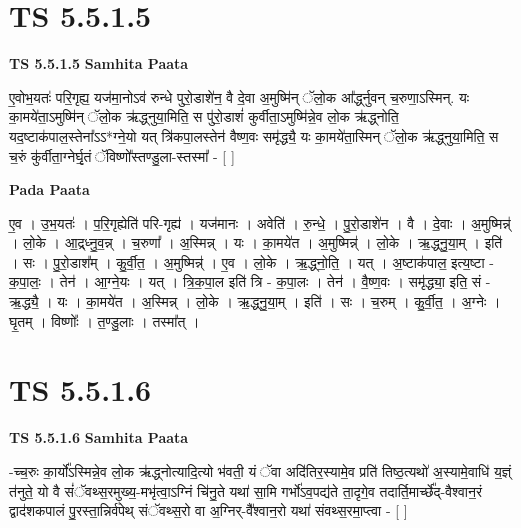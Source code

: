 \documentclass[17pt]{extarticle}
\begin{document}

\section{ TS 5.5.1.5 }

\textbf{TS 5.5.1.5 } \newline
\textbf{Samhita Paata} \newline

ए॒वोभ॒यतः॑ परि॒गृह्य॒ यज॑मा॒नोऽव॑ रुन्धे पुरो॒डाशे॑न॒ वै दे॒वा अ॒मुष्मि॑न् ॅलो॒क आ᳚र्द्ध्नुवन् च॒रुणा॒ऽस्मिन्. यः का॒मये॑ता॒ऽमुष्मि॑न् ॅलो॒क ऋ॑द्ध्नुया॒मिति॒ स पु॑रो॒डाशं॑ कुर्वीता॒ऽमुष्मि॑न्ने॒व लो॒क ऋ॑द्ध्नोति॒ यद॒ष्टाक॑पाल॒स्तेना᳚ऽऽ*ग्ने॒यो यत् त्रि॑कपा॒लस्तेन॑ वैष्ण॒वः समृ॑द्ध्यै॒ यः का॒मये॑ता॒स्मिन् ॅलो॒क ऋ॑द्ध्नुया॒मिति॒ स च॒रुं कु॑र्वीता॒ग्नेर्घृ॒तं ॅविष्णो᳚स्तण्डु॒ला-स्तस्मा᳚ - [  ] \newline

\textbf{Pada Paata} \newline

ए॒व । उ॒भ॒यतः॑ । प॒रि॒गृह्येति॑ परि-गृह्य॑ । यज॑मानः । अवेति॑ । रु॒न्धे॒ । पु॒रो॒डाशे॑न । वै । दे॒वाः । अ॒मुष्मिन्न्॑ । लो॒के । आ॒द्र्ध्नु॒व॒न्न् । च॒रुणा᳚ । अ॒स्मिन्न् । यः । का॒मये॑त । अ॒मुष्मिन्न्॑ । लो॒के । ऋ॒द्ध्नु॒या॒म् । इति॑ । सः । पु॒रो॒डाश᳚म् । कु॒र्वी॒त॒ । अ॒मुष्मिन्न्॑ । ए॒व । लो॒के । ऋ॒द्ध्नो॒ति॒ । यत् । अ॒ष्टाक॑पाल॒ इत्य॒ष्टा - क॒पा॒लः॒ । तेन॑ । आ॒ग्ने॒यः । यत् । त्रि॒क॒पा॒ल इति॑ त्रि - क॒पा॒लः । तेन॑ । वै॒ष्ण॒वः । समृ॑द्ध्या॒ इति॒ सं - ऋ॒द्ध्यै॒ । यः । का॒मये॑त । अ॒स्मिन्न् । लो॒के । ऋ॒द्ध्नु॒या॒म् । इति॑ । सः । च॒रुम् । कु॒र्वी॒त॒ । अ॒ग्नेः । घृ॒तम् । विष्णोः᳚ । त॒ण्डु॒लाः । तस्मा᳚त् ।  \newline





\section{ TS 5.5.1.6 }

\textbf{TS 5.5.1.6 } \newline
\textbf{Samhita Paata} \newline

-च्च॒रुः का॒र्यो᳚ऽस्मिन्ने॒व लो॒क ऋ॑द्ध्नोत्यादि॒त्यो भ॑वती॒ यं ॅवा अदि॑तिर॒स्यामे॒व प्रति॑ तिष्ठ॒त्यथो॑ अ॒स्यामे॒वाधि॑ य॒ज्ञ्ं त॑नुते॒ यो वै सं॑ॅवथ्स॒रमुख्य॒-मभृ॑त्वा॒ऽग्निं चि॑नु॒ते यथा॑ सा॒मि गर्भो॑ऽव॒पद्य॑ते ता॒दृगे॒व तदार्ति॒मार्च्छे᳚द्-वैश्वान॒रं द्वाद॑शकपालं पु॒रस्ता॒न्निर्व॑पेथ् संॅवथ्स॒रो वा अ॒ग्निर्-वै᳚श्वान॒रो यथा॑ संवथ्स॒रमा॒प्त्वा - [  ] \newline
\end{document}
